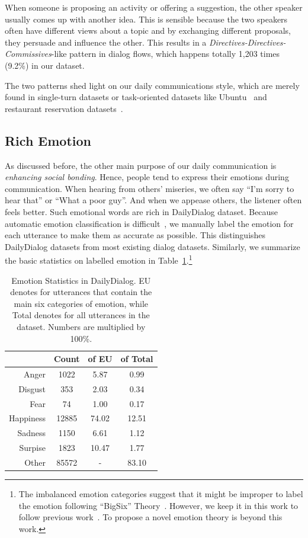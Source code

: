 \documentclass[11pt,letterpaper]{article}
\begin{document}
 When someone is proposing an activity or offering a suggestion, the other speaker usually comes up with another idea. This is sensible because the two speakers often have different views about a topic and by exchanging different proposals, they persuade and influence the other. This results in a \emph{Directives-Directives-Commissives}-like pattern in dialog flows, which happens totally 1,203 times (9.2\%) in our dataset. 

The two patterns shed light on our daily communications style, which are merely found in single-turn datasets or task-oriented datasets like Ubuntu~\cite{ubuntu} and restaurant reservation datasets~\cite{babi}.

\subsection{Rich Emotion}
As discussed before, the other main purpose of our daily communication is \emph{enhancing social bonding}. Hence, people tend to express their emotions during communication. When hearing from others' miseries, we often say ``I'm sorry to hear that'' or ``What a poor guy''. And when we appease others, the listener often feels better. Such emotional words are rich in DailyDialog dataset. Because automatic emotion classification is difficult~\cite{ECM}, we manually label the emotion for each utterance to make them as accurate as possible. This distinguishes DailyDialog datasets from most existing dialog datasets. Similarly, we summarize the basic statistics on labelled emotion in Table~\ref{emotion}.\footnote{The imbalanced emotion categories suggest that it might be improper to label the emotion following ``BigSix'' Theory~\cite{bigsix}. However, we keep it in this work to follow previous work~\cite{weibo}. To propose a novel emotion theory is beyond this work.} 

\begin{table}[h]
\centering
\begin{tabular}{rccc}
\toprule
& Count & of EU & of Total \\
\midrule
Anger&1022  &5.87  & 0.99 \\
Disgust& 353 & 2.03&   0.34\\
Fear & 74 & 1.00 &  0.17\\
Happiness& 12885&  74.02   &  12.51\\
Sadness& 1150 & 6.61  & 1.12\\
Surpise& 1823& 10.47& 1.77\\
Other& 85572&-& 83.10\\
\bottomrule
\end{tabular}
\caption{Emotion Statistics in DailyDialog. EU denotes for utterances that contain the main six categories of emotion, while Total denotes for all utterances in the dataset. Numbers are multiplied by 100\%.}
\label{emotion}
\end{table}
\end{document}
